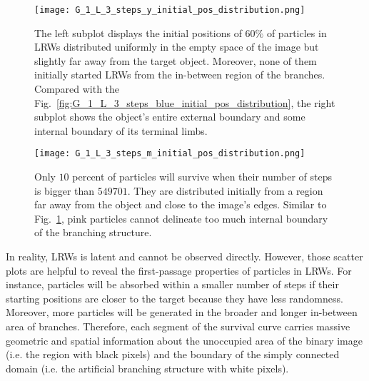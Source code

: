        \begin{figure}
         \centering
         \texttt{[image: G\_1\_L\_3\_steps\_y\_initial\_pos\_distribution.png]}
         \caption{The left subplot displays the initial positions of
           $60\%$ of particles in LRWs distributed uniformly in the
           empty space of the image but slightly far away from the
           target object. Moreover, none of them initially started
           LRWs from the in-between region of the branches. Compared
           with the
           Fig.~\ref{fig:G_1_L_3_steps_blue_initial_pos_distribution},
           the right subplot shows the object's entire external
           boundary and some internal boundary of its terminal limbs.}
         \label{fig:G_1_L_3_steps_yellow_initial_pos_distribution}
       \end{figure}


       \begin{figure}
         \centering
         \texttt{[image: G\_1\_L\_3\_steps\_m\_initial\_pos\_distribution.png]}
         \caption{Only $10$ percent of particles will survive when
           their number of steps is bigger than $549701$. They are
           distributed initially from a region far away from the
           object and close to the image's edges. Similar to
           Fig.~\ref{fig:G_1_L_3_steps_yellow_initial_pos_distribution},
           pink particles cannot delineate too much internal boundary
           of the branching structure.}
         \label{fig:G_1_L_3_steps_pink_initial_pos_distribution}
       \end{figure}



       In reality, LRWs is latent and cannot be observed
       directly. However, those scatter plots are helpful to reveal
       the first-passage properties of particles in LRWs. For
       instance, particles will be absorbed within a smaller number of
       steps if their starting positions are closer to the target
       because they have less randomness. Moreover, more particles
       will be generated in the broader and longer in-between area of
       branches. Therefore, each segment of the survival curve carries
       massive geometric and spatial information about the unoccupied
       area of the binary image (i.e. the region with black pixels)
       and the boundary of the simply connected domain (i.e. the
       artificial branching structure with white pixels).



